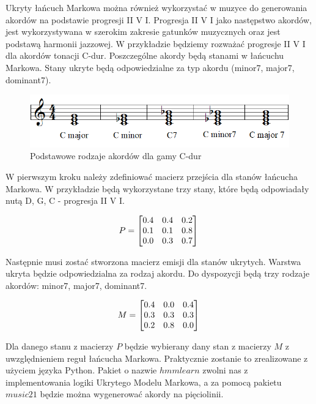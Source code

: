 \begin{przyklad}
	Ukryty łańcuch Markowa można również wykorzystać w muzyce do generowania akordów na podstawie progresji II V I. Progresja II V I jako następstwo akordów, jest wykorzystywana w szerokim zakresie gatunków muzycznych oraz jest podstawą harmonii jazzowej. W przykładzie będziemy rozważać progresje II V I dla akordów tonacji C-dur. Poszczególne akordy będą stanami w łańcuchu Markowa. Stany ukryte będą odpowiedzialne za typ akordu (minor7, major7, dominant7).
	
 \begin{figure}[H]
 	\centering
 	\includegraphics[width=0.7\linewidth]{akordy}
 	\caption{Podstawowe rodzaje akordów dla gamy C-dur}
 	\label{fig:akordy}
 \end{figure}

	W pierwszym kroku należy zdefiniować macierz przejścia dla stanów łańcucha Markowa. W przykładzie będą wykorzystane trzy stany, które będą odpowiadały nutą D, G, C - progresja II V I.
	
	\[
	P = 
	\begin{bmatrix}
	0.4 & 0.4 & 0.2 \\
	0.1 & 0.1 & 0.8 \\
	0.0 & 0.3 & 0.7 
	\end{bmatrix}\\
	\]
 
	Następnie musi zostać stworzona macierz emisji dla stanów ukrytych. Warstwa ukryta będzie odpowiedzialna za rodzaj akordu. Do dyspozycji będą trzy rodzaje akordów: minor7, major7, dominant7.
	
	\[
	M = 
	\begin{bmatrix}
	0.4 & 0.0 & 0.4 \\
	0.3 & 0.3 & 0.3 \\
	0.2 & 0.8 & 0.0 
	\end{bmatrix}\\
	\]
	 
	Dla danego stanu z macierzy $P$ będzie wybierany dany stan z macierzy $M$ z uwzględnieniem reguł łańcucha Markowa. Praktycznie zostanie to zrealizowane z użyciem języka Python. Pakiet o nazwie $hmmlearn$ zwolni nas z implementowania logiki Ukrytego Modelu Markowa, a za pomocą pakietu $music21$ będzie można wygenerować akordy na pięciolinii. 
	

\end{przyklad}
